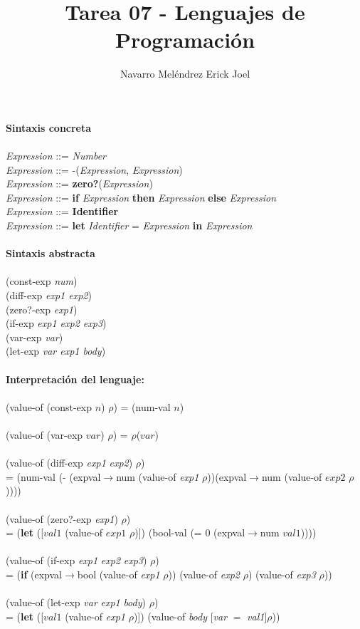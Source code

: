 \documentclass[14pt]{article}
\title{\textbf{Tarea 07 - Lenguajes de Programación}}
\author{Navarro Meléndrez Erick Joel}
\begin{document}
	   
	\maketitle
	\textbf{Sintaxis concreta}
	\\
	\\\textit{Expression} ::= \textit{Number}
	\\\textit{Expression} ::= -(\textit{Expression}, \textit{Expression})
	\\\textit{Expression} ::= \textbf{zero?}(\textit{Expression})
	\\\textit{Expression} ::= \textbf{if} \textit{Expression} \textbf{then} \textit{Expression} \textbf{else} \textit{Expression}
	\\\textit{Expression} ::= \textbf{Identifier}
	\\\textit{Expression} ::= \textbf{let} \textit{Identifier} = \textit{Expression} \textbf{in} \textit{Expression}
	\\\\
	\textbf{Sintaxis abstracta}
	\\
	\\(const-exp \textit{num})
	\\(diff-exp \textit{exp1 exp2})
	\\(zero?-exp \textit{exp1})
	\\(if-exp \textit{exp1 exp2 exp3})
	\\(var-exp \textit{var})
	\\(let-exp \textit{var exp1 body})
	\\\\ 
	\textbf{Interpretación del lenguaje:}
	\\\\
	(value-of (const-exp $n$) $\rho$) = (num-val $n$)
	\\\\
	(value-of (var-exp $var$) $\rho$) = $\rho$($var$)
	\\\\
	(value-of (diff-exp \textit{exp1} \textit{exp2}) $\rho$)\\ = (num-val (- (expval$\rightarrow$num (value-of \textit{exp1} $\rho$))(expval$\rightarrow$num (value-of $exp2$ $\rho$))))
	\\\\
	(value-of (zero?-exp \textit{exp1}) $\rho$)\\ = (\textbf{let} ([$val1$ (value-of $exp1$ $\rho$)]) (bool-val (= 0 (expval$\rightarrow$num $val1$))))
	\\\\
	(value-of (if-exp \textit{exp1} \textit{exp2} \textit{exp3}) $\rho$)\\ = (\textbf{if} (expval$\rightarrow$bool (value-of \textit{exp1} $\rho$)) (value-of \textit{exp2} $\rho$) (value-of \textit{exp3} $\rho$))
	\\\\
	(value-of (let-exp \textit{var} \textit{exp1} \textit{body}) $\rho$)\\ = (\textbf{let} ([$val1$ (value-of \textit{exp1} $\rho$)]) (value-of \textit{body} [\textit{var} $=$ \textit{val1}]$\rho$))
	\\\\
\end{document}
